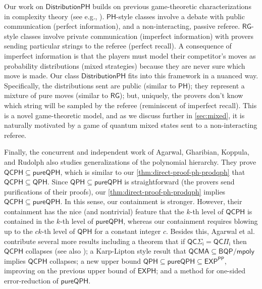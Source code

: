 \documentclass[10pt,a4paper]{article}
\theoremstyle{definition}
\newcommand{\class}[1]{\ensuremath{\mathsf{#1}}\xspace}
\newcommand{\EXP}{\class{EXP}}
\newcommand{\QCMA}{\class{QCMA}}
\newcommand{\RG}{\class{RG}}
\newcommand{\PP}{\class{PP}}
\newcommand{\EXPH}{\class{EXPH}}
\newcommand{\PH}{\class{PH}}
\newcommand{\QCPH}{\class{QCPH}}
\newcommand{\QCSigmai}[1][i]{\class{QC\Sigma_{#1}}}
\newcommand{\QCPii}[1][i]{\class{QC\Pi_{#1}}}
\newcommand{\QPH}{\class{QPH}}
\newcommand{\pureQPH}{\class{pureQPH}}
\newcommand{\distributionPH}{\mixedPH}
\newcommand{\mixedPH}{\class{DistributionPH}}
\begin{document}
Our work on $\distributionPH$ builds on previous game-theoretic characterizations in complexity theory (see e.g., \cite{feigenbaum1995game}).
$\PH$-style classes involve a debate with public communication (perfect information), and a non-interacting, passive referee.
$\RG$-style classes involve private communication (imperfect information) with provers sending particular strings to the referee (perfect recall).
A consequence of imperfect information is that the players must model their competitor's moves as probability distributions (mixed strategies) because they are never sure which move is made.
Our class $\distributionPH$ fits into this framework in a nuanced way.
Specifically, the distributions sent are public (similar to $\PH$); they represent a mixture of pure moves (similar to $\RG$); but, uniquely, the provers don't know which string will be sampled by the referee (reminiscent of imperfect recall). 
This is a novel game-theoretic model, and as we discuss further in \cref{sec:mixed}, it is naturally motivated by a game of quantum mixed states sent to a non-interacting referee.



Finally, the concurrent and independent work of Agarwal, Gharibian, Koppula, and Rudolph \cite{agarwal2023quantum} also studies generalizations of the polynomial hierarchy.
They prove $\QCPH \subseteq \pureQPH$, which is similar to our \cref{thm:direct-proof-ph-prodqph} that $\QCPH \subseteq \QPH$.
Since $\QPH\subseteq \pureQPH$ is straightforward (the provers send purifications of their proofs), our \cref{thm:direct-proof-ph-prodqph} implies $\QCPH\subseteq \pureQPH$.
In this sense, our containment is stronger.
However, their containment has the nice (and nontrivial) feature that the $k$-th level of $\QCPH$ is contained in the $k$-th level of $\pureQPH$, whereas our containment requires blowing up to the $ck$-th level of $\QPH$ for a constant integer $c$. 
Besides this,
Agarwal et al. contribute several more results including a theorem that if $\QCSigmai=\QCPii$ then $\QCPH$ collapses (see also \cite{falor2023collapsible}); a Karp-Lipton style result that $\QCMA \subseteq \class{BQP/mpoly}$ implies $\QCPH$ collapses; a new upper bound $\QPH\subseteq \pureQPH \subseteq \EXP^{\PP}$, improving on the previous upper bound of $\EXPH$; and a method for one-sided error-reduction of $\pureQPH$.
\end{document}
